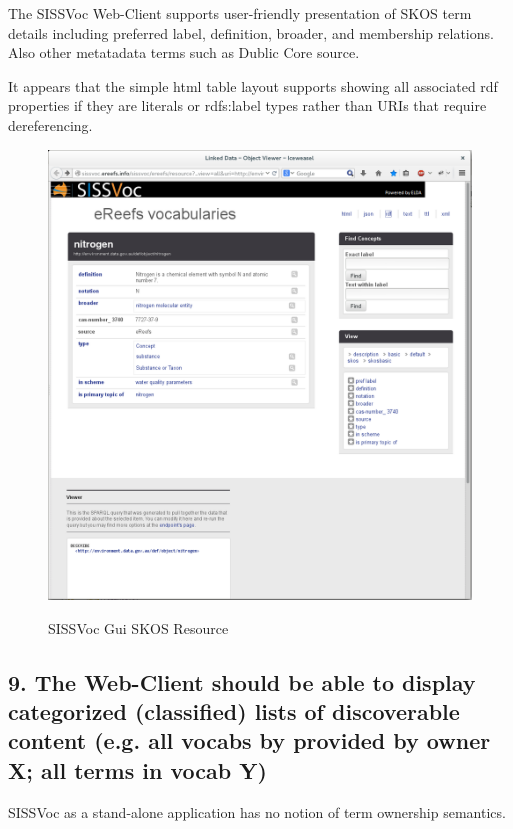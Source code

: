 \documentclass[10pt,a4paper]{article}
\begin{document}
\begin{flushleft}
The SISSVoc Web-Client supports user-friendly presentation of SKOS term details
including preferred label, definition, broader, and membership relations. Also
other metatadata terms such as Dublic Core source. 

It appears that the simple html table layout supports showing all associated rdf
properties if they are literals or rdfs:label types rather than URIs that
require dereferencing.

\begin{figure}[H]
\centering
\caption{SISSVoc Gui SKOS Resource }
\includegraphics[width=12cm]{nitrogen}  
\label{fig:test}
\end{figure}



\subsection{ 9. The Web-Client should be able to display categorized
(classified) lists of discoverable content (e.g. all vocabs by provided by
owner X; all terms in vocab Y) }


\item[SISSVoc] as a stand-alone application has no notion of term ownership semantics.  


\end{flushleft}
\end{document}
